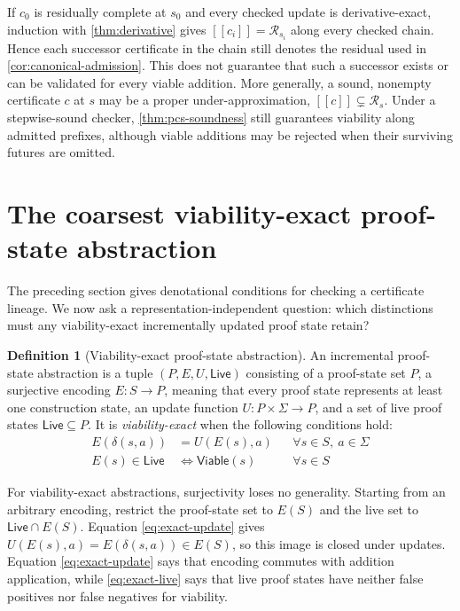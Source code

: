 \documentclass[11pt]{article}
\theoremstyle{definition}
\newtheorem{definition}[definition]{Definition}
\newcommand{\States}{S}
\newcommand{\Additions}{\Sigma}
\newcommand{\Viable}{\mathsf{Viable}}
\newcommand{\Residual}{\mathcal R}
\newcommand{\ProofStates}{P}
\newcommand{\Live}{\mathsf{Live}}
\newcommand{\Encode}{E}
\newcommand{\Update}{U}
\newcommand{\denote}[1]{\left[\!\left[#1\right]\!\right]}
\begin{document}
If $c_0$ is residually complete at $s_0$ and every checked update is derivative-exact, induction with \cref{thm:derivative} gives $\denote{c_i}=\Residual_{s_i}$ along every checked chain. Hence each successor certificate in the chain still denotes the residual used in \cref{cor:canonical-admission}. This does not guarantee that such a successor exists or can be validated for every viable addition. More generally, a sound, nonempty certificate $c$ at $s$ may be a proper under-approximation, $\denote{c}\subsetneq\Residual_s$. Under a stepwise-sound checker, \cref{thm:pcs-soundness} still guarantees viability along admitted prefixes, although viable additions may be rejected when their surviving futures are omitted.

\section{The coarsest viability-exact proof-state abstraction}\label{sec:minimal}

The preceding section gives denotational conditions for checking a certificate
lineage. We now ask a representation-independent question: which distinctions
must any viability-exact incrementally updated proof state retain?

\begin{definition}[Viability-exact proof-state abstraction]\label{def:exact-abstraction}
An incremental proof-state abstraction is a tuple
$(\ProofStates,\Encode,\Update,\Live)$ consisting of a proof-state set
$\ProofStates$, a surjective encoding
$\Encode:\States\to\ProofStates$, meaning that every proof state represents at least one construction state, an update function
$\Update:\ProofStates\times\Additions\to\ProofStates$, and a set of live proof states $\Live\subseteq\ProofStates$. It is \emph{viability-exact}
when the following conditions hold:
\begin{align}
  \Encode(\delta(s,a))
    &=\Update(\Encode(s),a)
    &&\forall s\in\States,\ a\in\Additions
    \label{eq:exact-update}\\
  \Encode(s)\in\Live
    &\Longleftrightarrow\Viable(s)
    &&\forall s\in\States
    \label{eq:exact-live}
\end{align}
\end{definition}

For viability-exact abstractions, surjectivity loses no generality. Starting from an arbitrary encoding, restrict the proof-state set to $\Encode(\States)$ and the live set to $\Live\cap\Encode(\States)$. Equation \eqref{eq:exact-update} gives $\Update(\Encode(s),a)=\Encode(\delta(s,a))\in\Encode(\States)$, so this image is closed under updates. Equation \eqref{eq:exact-update} says that encoding commutes with addition application, while \eqref{eq:exact-live} says that live proof states have neither false positives nor false negatives for viability.
\end{document}
